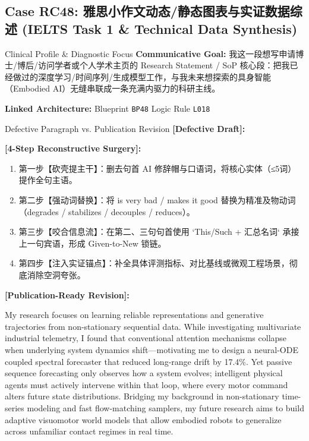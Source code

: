 \subsection{Case RC48: 雅思小作文动态/静态图表与实证数据综述 (IELTS Task 1 \& Technical Data Synthesis)}\label{case:RC48}
\begin{ConceptBox}{Clinical Profile \& Diagnostic Focus}
\textbf{Communicative Goal:} 我这一段想写申请博士/博后/访问学者或个人学术主页的 Research Statement / SoP 核心段：把我已经做过的深度学习/时间序列/生成模型工作，与我未来想探索的具身智能（Embodied AI）无缝串联成一条充满内驱力的科研主线。\par
\textbf{Linked Architecture:} Blueprint \texttt{BP48} \enspace\textbar\enspace Logic Rule \texttt{L018}
\end{ConceptBox}
\begin{ExampleBox}{Defective Paragraph vs. Publication Revision}
\textbf{\color{TargetHighlight}[Defective Draft]:}\par
{}\par\vspace{6pt}
\textbf{\color{AcadForest}[4-Step Reconstructive Surgery]:}
\begin{enumerate}[label=\textbf{\color{AcadNavy}Step \arabic*:}, leftmargin=2em]
  \item 第一步【砍壳提主干】：删去句首 AI 修辞帽与口语词，将核心实体（≤5词）提作全句主语。
  \item 第二步【强动词替换】：将 is very bad / makes it good 替换为精准及物动词（degrades / stabilizes / decouples / reduces）。
  \item 第三步【咬合信息流】：在第二、三句句首使用 `This/Such + 汇总名词` 承接上一句宾语，形成 Given-to-New 锁链。
  \item 第四步【注入实证锚点】：补全具体评测指标、对比基线或微观工程场景，彻底消除空洞夸张。
\end{enumerate}\vspace{4pt}
\textbf{\color{AcadNavy}[Publication-Ready Revision]:}\par
My research focuses on learning reliable representations and generative trajectories from non-stationary sequential data. While investigating multivariate industrial telemetry, I found that conventional attention mechanisms collapse when underlying system dynamics shift---motivating me to design a neural-ODE coupled spectral forecaster that reduced long-range drift by 17.4\%. Yet passive sequence forecasting only observes how a system evolves; intelligent physical agents must actively intervene within that loop, where every motor command alters future state distributions. Bridging my background in non-stationary time-series modeling and fast flow-matching samplers, my future research aims to build adaptive visuomotor world models that allow embodied robots to generalize across unfamiliar contact regimes in real time.
\end{ExampleBox}
